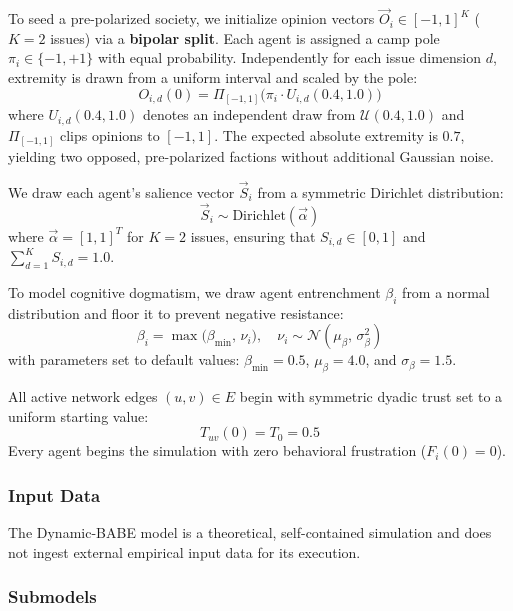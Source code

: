 To seed a pre-polarized society, we initialize opinion vectors $\vec{O}_i \in [-1, 1]^K$ ($K = 2$ issues) via a \textbf{bipolar split}. Each agent is assigned a camp pole $\pi_i \in \{-1, +1\}$ with equal probability. Independently for each issue dimension $d$, extremity is drawn from a uniform interval and scaled by the pole:
\begin{equation}
    O_{i,d}(0) = \Pi_{[-1, 1]}\Big( \pi_i \cdot U_{i,d}(0.4, 1.0) \Big)
\end{equation}
where $U_{i,d}(0.4, 1.0)$ denotes an independent draw from $\mathcal{U}(0.4, 1.0)$ and $\Pi_{[-1, 1]}$ clips opinions to $[-1, 1]$. The expected absolute extremity is $0.7$, yielding two opposed, pre-polarized factions without additional Gaussian noise.

We draw each agent's salience vector $\vec{S}_i$ from a symmetric Dirichlet distribution:
\begin{equation}
    \vec{S}_i \sim \text{Dirichlet}(\vec{\alpha})
\end{equation}
where $\vec{\alpha} = [1, 1]^T$ for $K = 2$ issues, ensuring that $S_{i,d} \in [0, 1]$ and $\sum_{d=1}^K S_{i,d} = 1.0$.

To model cognitive dogmatism, we draw agent entrenchment $\beta_i$ from a normal distribution and floor it to prevent negative resistance:
\begin{equation}
    \beta_i = \max\Big( \beta_{\min},\, \nu_i \Big), \quad \nu_i \sim \mathcal{N}(\mu_{\beta},\, \sigma_{\beta}^2)
\end{equation}
with parameters set to default values: $\beta_{\min} = 0.5$, $\mu_{\beta} = 4.0$, and $\sigma_{\beta} = 1.5$.

All active network edges $(u, v) \in E$ begin with symmetric dyadic trust set to a uniform starting value:
\begin{equation}
    T_{uv}(0) = T_0 = 0.5
\end{equation}
Every agent begins the simulation with zero behavioral frustration ($F_i(0) = 0$).

\subsubsection{Input Data}
The Dynamic-BABE model is a theoretical, self-contained simulation and does not ingest external empirical input data for its execution.

\subsubsection{Submodels}

